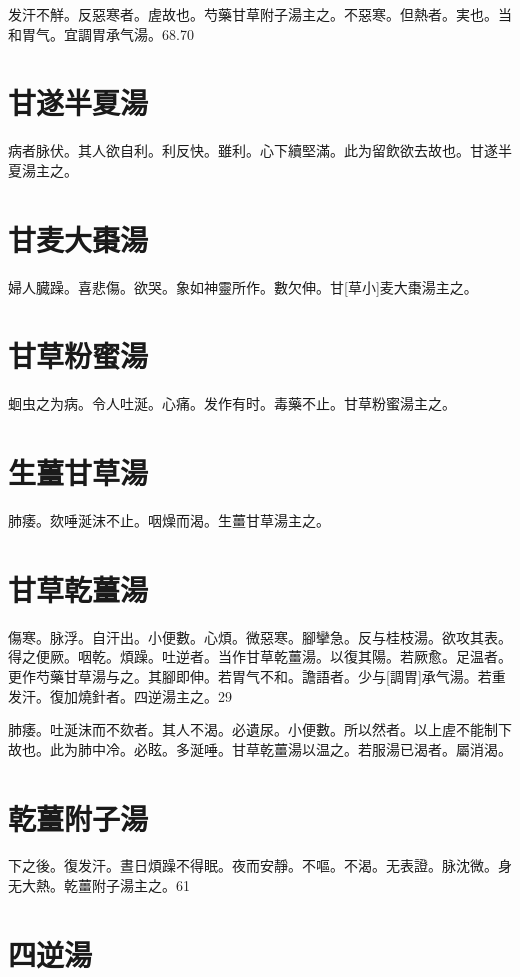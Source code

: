 \documentclass[12pt,twoside,UTF8,b5paper]{ctexbook}
\begin{document}
发汗不觧。反惡寒者。虗故也。芍藥甘草附子湯主之。不惡寒。但熱者。実也。当和胃气。宜調胃承气湯。68.70

\section{甘遂半夏湯}

病者脉伏。其人欲自利。利反快。雖利。心下續堅滿。此为留飲欲去故也。甘遂半夏湯主之。

\section{甘麦大棗湯}

婦人臓躁。喜悲傷。欲哭。象如神靈所作。數欠伸。甘[草小]麦大棗湯主之。

\section{甘草粉蜜湯}

蛔虫之为病。令人吐涎。心痛。发作有时。毒藥不止。甘草粉蜜湯主之。

\section{生薑甘草湯}

肺痿。欬唾涎沫不止。咽燥而渴。生薑甘草湯主之。

\section{甘草乾薑湯}

傷寒。脉浮。自汗出。小便數。心煩。微惡寒。腳攣急。反与桂枝湯。欲攻其表。得之便厥。咽乾。煩躁。吐逆者。当作甘草乾薑湯。以復其陽。若厥愈。足温者。更作芍藥甘草湯与之。其腳即伸。若胃气不和。譫語者。少与[調胃]承气湯。若重发汗。復加燒針者。四逆湯主之。29

肺痿。吐涎沫而不欬者。其人不渴。必遺尿。小便數。所以然者。以上虗不能制下故也。此为肺中冷。必眩。多涎唾。甘草乾薑湯以温之。若服湯已渴者。屬消渴。

\section{乾薑附子湯}

下之後。復发汗。晝日煩躁不得眠。夜而安靜。不嘔。不渴。无表證。脉沈微。身无大熱。乾薑附子湯主之。61

\section{四逆湯}
\end{document}
